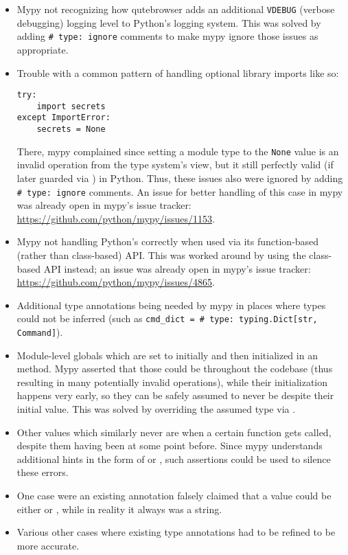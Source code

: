 \begin{itemize}
  \item Mypy not recognizing how qutebrowser adds an additional \verb|VDEBUG|
    (verbose debugging) logging level to Python's logging system. This was
    solved by adding \texttt{# type: ignore} comments to make mypy ignore those
    issues as appropriate.
  \item Trouble with a common pattern of handling optional library imports like so:
    \begin{verbatim}
try:
    import secrets
except ImportError:
    secrets = None
\end{verbatim}
    There, mypy complained since setting a module type to the
    \verb|None| value is an invalid operation from the type system's view, but
    it still perfectly valid (if later guarded via )
    in Python. Thus, these issues also were ignored by adding \texttt{# type: ignore}
    comments. An issue for better handling of this case in mypy was already
    open in mypy's issue tracker: \url{https://github.com/python/mypy/issues/1153}.
  \item Mypy not handling Python's  correctly when used via
    its function-based (rather than class-based) API. This was worked around by
    using the class-based API instead; an issue was already open in mypy's issue
    tracker: \\ \url{https://github.com/python/mypy/issues/4865}.
  \item Additional type annotations being needed by mypy in places where types
    could not be inferred (such as \texttt{cmd_dict = {}  # type: typing.Dict[str, Command]}).
  \item Module-level globals which are set to  initially and then
    initialized in an  method. Mypy asserted that those could be 
    throughout the codebase (thus resulting in many potentially invalid operations),
    while their initialization happens very early, so they can be safely assumed
    to never be  despite their initial value. This was solved by
    overriding the assumed type via .
  \item Other values which similarly never are  when a certain function
    gets called, despite them having been  at some point before. Since
    mypy understands additional hints in the form of  or , such assertions could be used
    to silence these errors.
  \item One case were an existing  annotation falsely
    claimed that a value could be either  or , while in reality
    it always was a string.
  \item Various other cases where existing type annotations had to be refined to
    be more accurate.
\end{itemize}

